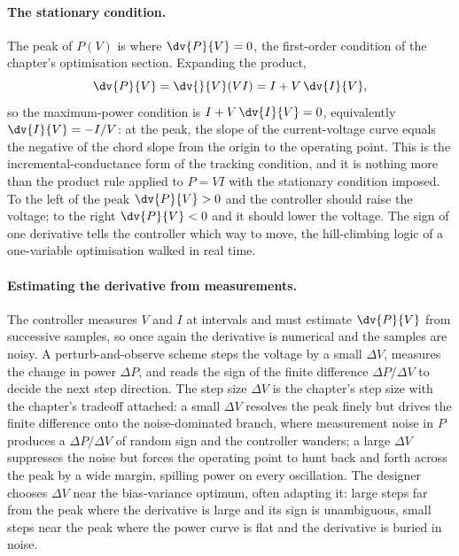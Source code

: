 \paragraph{The stationary condition.}
The peak of $P(V)$ is where $\dv{P}{V} = 0$, the first-order condition
of the chapter's optimisation section. Expanding the product,
\[
\dv{P}{V} = \dv{}{V}(V I) = I + V\,\dv{I}{V},
\]
so the maximum-power condition is $I + V\,\dv{I}{V} = 0$, equivalently
$\dv{I}{V} = -I/V$: at the peak, the slope of the current-voltage curve
equals the negative of the chord slope from the origin to the operating
point. This is the incremental-conductance form of the tracking
condition, and it is nothing more than the product rule applied to
$P = VI$ with the stationary condition imposed. To the left of the
peak $\dv{P}{V} > 0$ and the controller should raise the voltage; to
the right $\dv{P}{V} < 0$ and it should lower the voltage. The sign of
one derivative tells the controller which way to move, the
hill-climbing logic of a one-variable optimisation walked in real
time.

\paragraph{Estimating the derivative from measurements.}
The controller measures $V$ and $I$ at intervals and must estimate
$\dv{P}{V}$ from successive samples, so once again the derivative is
numerical and the samples are noisy. A perturb-and-observe scheme
steps the voltage by a small $\Delta V$, measures the change in power
$\Delta P$, and reads the sign of the finite difference $\Delta P/
\Delta V$ to decide the next step direction. The step size $\Delta V$
is the chapter's step size with the chapter's tradeoff attached: a
small $\Delta V$ resolves the peak finely but drives the finite
difference onto the noise-dominated branch, where measurement noise in
$P$ produces a $\Delta P/\Delta V$ of random sign and the controller
wanders; a large $\Delta V$ suppresses the noise but forces the
operating point to hunt back and forth across the peak by a wide
margin, spilling power on every oscillation. The designer chooses
$\Delta V$ near the bias-variance optimum, often adapting it: large
steps far from the peak where the derivative is large and its sign is
unambiguous, small steps near the peak where the power curve is flat
and the derivative is buried in noise.

